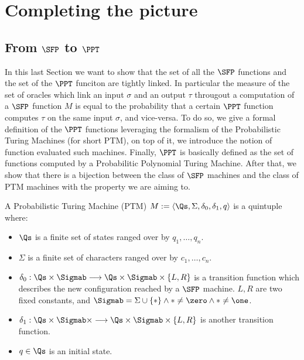\section{Completing the picture}

\subsection{From $\SFP$ to $\PPT$}
\label{sub:SFPtoPPT}

In this last Section we want to show that the set of all the $\SFP$ functions
and the set of the $\PPT$ funciton are tightly linked. In particular
the measure of the set of oracles which link an input $\sigma$ and an
output $\tau$ througout a computation of a $\SFP$ function $M$ is equal
to the probability that
a certain $\PPT$ function computes $\tau$ on the same input $\sigma$, and vice-versa.
%
To do so, we give a formal definition of the $\PPT$ functions leveraging the formalism
of the Probabilistic Turing Machines (for short PTM), on top of it, we introduce
the notion of function evaluated such machines. Finally, $\PPT$ is basically defined as
the set of functions computed by a Probabilitic Polynomial Turing Machine.
 After that, we show that there
is a bijection between the class of $\SFP$ machines and the class of PTM machines
with the property we are aiming to.
%

\begin{defn}
A Probabilistic Turing Machine (PTM)
$M:= \langle \Qs, \Sigma, {\delta}_0, {\delta}_1, q \rangle$ is a quintuple where:
\begin{itemize}
\item $\Qs$ is a finite set of states ranged over by $q_1, \ldots, q_n$.
\item $\Sigma$ is a finite set of characters ranged over by $c_1, \ldots, c_n$.
\item $\delta_0 : \Qs \times \Sigmab \longrightarrow \Qs \times \Sigmab \times \{L, R\}$
is a transition function which describes the new configuration reached by a $\SFP$ machine.
$L, R$ are two fixed constants, and $\Sigmab =\Sigma \cup \{*\} \land *\neq \zero \land * \neq \one$.
\item $\delta_1 : \Qs \times \Sigmab  \times \longrightarrow \Qs \times \Sigmab \times \{L, R\}$ is another transition function.
\item $q \in \Qs$ is an initial state.
\end{itemize}
\end{defn}

